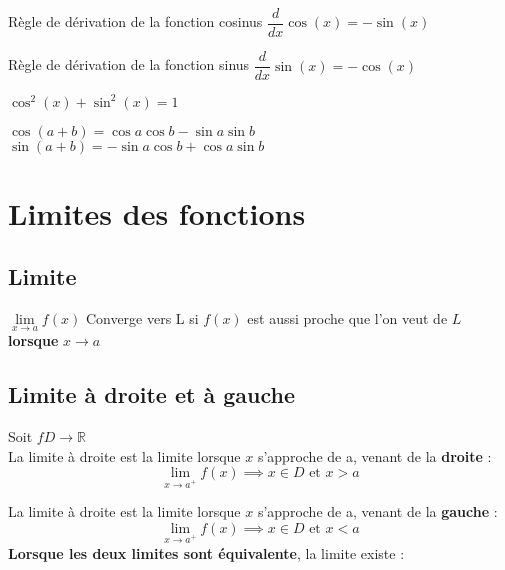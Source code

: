 \documentclass[2pt]{report}
\begin{document}
\begin{multicols*}{3}
\begin{Identite}{Règle de dérivation de la fonction cosinus}{}
  $\dfrac{d}{dx}\cos\left(x\right) = -\sin\left(x\right)$
\end{Identite}

\begin{Identite}{Règle de dérivation de la fonction sinus}{}
  $\dfrac{d}{dx}\sin\left(x\right) = -\cos\left(x\right)$
\end{Identite}

\begin{Identite}{}{}
    $\cos^2\left(x\right) + \sin^2\left(x\right) = 1 $ 
\end{Identite}

\begin{Identite}{}{}
    $\cos\left(a +b \right) = \cos a \cos b -\sin a \sin b$
    $\sin\left(a +b \right) = -\sin a \cos b + \cos a \sin b$
\end{Identite}

\chapter{Limites des fonctions}
\section{Limite}
\begin{Definitionx*}{}{}
  $ \lim\limits_{x\to a}f(x)$ \textcolor{myb}{Converge vers L} si $f(x)$ est aussi proche que l'on veut de 
  $L$ \textbf{lorsque}   $x \to a$

\end{Definitionx*}

\section{Limite à droite et à gauche}
\begin{Definitionx*}{}{}
    Soit $f D\rightarrow \mathbb{R}$ \\ 
    \textcolor{myb}{La limite à droite} est la limite lorsque $x$ s'approche de a, venant de la 
    \textbf{droite}   : \\ 
    \[ \lim\limits_{x\to a^{+}} f(x) \implies  x \in D \text{ et } x > a \] 

    \textcolor{myb}{La limite à droite} est la limite lorsque $x$ s'approche de a, venant de la \textbf{gauche} : \\ 
    \[ \lim\limits_{x\to a^{+}} f(x) \implies  x \in D \text{ et } x < a \]   
  \textbf{Lorsque les deux limites sont équivalente}, \textcolor{myb}{la limite existe } :   
  

\end{Definitionx*}
\end{multicols*}
\end{document}
